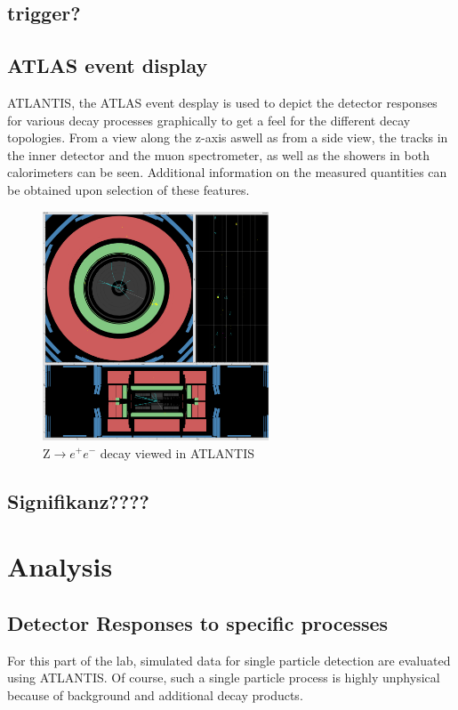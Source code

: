 \documentclass[twoside,        %
               BCOR12mm,       %
               ngerman,english, %
               fleqn,headsepline=false,footsepline=false
              ]{Vorlage/MFPREPORT}
\begin{document}
\subsection{trigger?}

\subsection{ATLAS event display}
ATLANTIS, the ATLAS event desplay is used to depict the detector responses for
various decay processes graphically to get a feel for the different decay
topologies. From a view along the z-axis aswell as from a side view, the tracks
in the inner detector and the muon spectrometer, as well as the showers in both
calorimeters can be seen. Additional information on the measured quantities can
be obtained upon selection of these features.
\begin{figure}[]
    \centering
        \includegraphics[width=0.6\textwidth]{fig/Zee}
    \caption{Z$\rightarrow e^+e^-$ decay viewed in ATLANTIS}
    \label{fig:atlantis}
\end{figure}


\subsection{Signifikanz????}
\cite{signifikanz}


\section{Analysis}
\label{sec:analysis}
\subsection{Detector Responses to specific processes}
For this part of the lab, simulated data for single particle detection are
evaluated using ATLANTIS. Of course, such a single particle process is highly
unphysical because of background and additional decay products.
\end{document}
